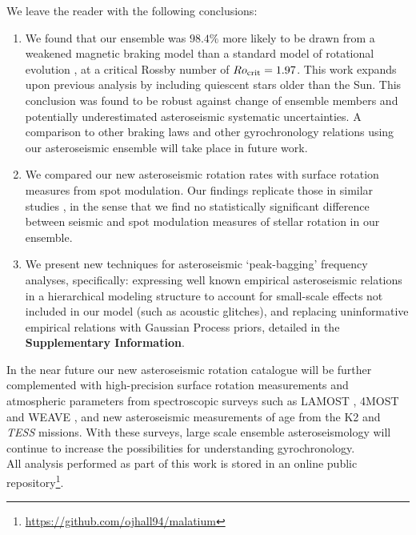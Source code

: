\documentclass[12pt]{article}
\newcommand{\tess}{\emph{TESS}\xspace}
\newcommand{\ktwo}{K2\xspace}
\begin{document}
We leave the reader with the following conclusions:
\begin{enumerate}
	\item We found that our ensemble was $98.4\%$ more likely to be drawn from a weakened magnetic braking model than a standard model of rotational evolution \cite{vansaders+pinsonneault2013}, at a critical Rossby number of $Ro_{\rm{crit}} = 1.97$. This work expands upon previous analysis \cite{vansaders+2019} by including quiescent stars older than the Sun. This conclusion was found to be robust against change of ensemble members and potentially underestimated asteroseismic systematic uncertainties. A comparison to other braking laws \cite{matt+2015} and other gyrochronology relations \cite{barnes2010} using our asteroseismic ensemble will take place in future work.
	
	\item We compared our new asteroseismic rotation rates with surface rotation measures from spot modulation. Our findings replicate those in similar studies \cite{nielsen+2015,benomar+2015}, in the sense that we find no statistically significant difference between seismic and spot modulation measures of stellar rotation in our ensemble.
	
	\item We present new techniques for asteroseismic `peak-bagging' frequency analyses, specifically: expressing well known empirical asteroseismic relations in a hierarchical modeling structure to account for small-scale effects not included in our model (such as acoustic glitches), and replacing uninformative empirical relations with Gaussian Process priors, detailed in the \textbf{Supplementary Information}.
	
\end{enumerate}

In the near future our new asteroseismic rotation catalogue will be further complemented with high-precision surface rotation measurements and atmospheric parameters from spectroscopic surveys such as LAMOST \cite{deng+2012}, 4MOST \cite{dejong+2014} and WEAVE \cite{dalton+2014}, and new asteroseismic measurements of age from the \ktwo and \tess missions. With these surveys, large scale ensemble asteroseismology will continue to increase the possibilities for understanding gyrochronology.\\

All analysis performed as part of this work is stored in an online public repository\footnote{\url{https://github.com/ojhall94/malatium}}.\\
\end{document}
